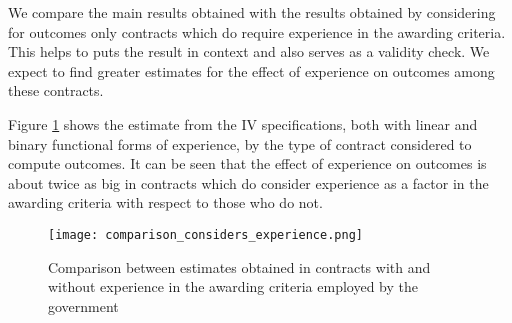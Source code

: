 We compare the main results obtained with the results obtained by considering for outcomes only contracts which do require experience in the awarding criteria. This helps to puts the result in context and also serves as a validity check. We expect to find greater estimates for the effect of experience on outcomes among these contracts.

Figure \ref{fig:comparison_considers_experience} shows the estimate from the IV specifications, both with linear and binary functional forms of experience, by the type of contract considered to compute outcomes. It can be seen that the effect of experience on outcomes is about twice as big in contracts which do consider experience as a factor in the awarding criteria with respect to those who do not.

\begin{figure}[H]
  \texttt{[image: comparison\_considers\_experience.png]}
  \caption{Comparison between estimates obtained in contracts with and without experience in the awarding criteria employed by the government}
  \label{fig:comparison_considers_experience}
\end{figure}




%


